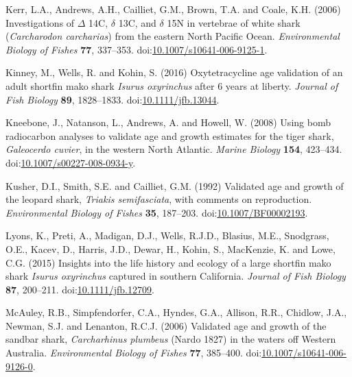 \documentclass[]{article}
\begin{document}
\hypertarget{ref-kerr_investigations_2006}{}
Kerr, L.A., Andrews, A.H., Cailliet, G.M., Brown, T.A. and Coale, K.H.
(2006) Investigations of \(\Delta\) 14C, \(\delta\) 13C, and \(\delta\)
15N in vertebrae of white shark (\emph{Carcharodon carcharias}) from the
eastern North Pacific Ocean. \emph{Environmental Biology of Fishes}
\textbf{77}, 337--353.
doi:\href{https://doi.org/10.1007/s10641-006-9125-1}{10.1007/s10641-006-9125-1}.

\hypertarget{ref-kinney_oxytetracycline_2016}{}
Kinney, M., Wells, R. and Kohin, S. (2016) Oxytetracycline age
validation of an adult shortfin mako shark \emph{Isurus oxyrinchus}
after 6 years at liberty. \emph{Journal of Fish Biology} \textbf{89},
1828--1833.
doi:\href{https://doi.org/10.1111/jfb.13044}{10.1111/jfb.13044}.

\hypertarget{ref-kneebone_using_2008}{}
Kneebone, J., Natanson, L., Andrews, A. and Howell, W. (2008) Using bomb
radiocarbon analyses to validate age and growth estimates for the tiger
shark, \emph{Galeocerdo cuvier}, in the western North Atlantic.
\emph{Marine Biology} \textbf{154}, 423--434.
doi:\href{https://doi.org/10.1007/s00227-008-0934-y}{10.1007/s00227-008-0934-y}.

\hypertarget{ref-kusher_validated_1992}{}
Kusher, D.I., Smith, S.E. and Cailliet, G.M. (1992) Validated age and
growth of the leopard shark, \emph{Triakis semifasciata}, with comments
on reproduction. \emph{Environmental Biology of Fishes} \textbf{35},
187--203.
doi:\href{https://doi.org/10.1007/BF00002193}{10.1007/BF00002193}.

\hypertarget{ref-lyons_insights_2015}{}
Lyons, K., Preti, A., Madigan, D.J., Wells, R.J.D., Blasius, M.E.,
Snodgrass, O.E., Kacev, D., Harris, J.D., Dewar, H., Kohin, S.,
MacKenzie, K. and Lowe, C.G. (2015) Insights into the life history and
ecology of a large shortfin mako shark \emph{Isurus oxyrinchus} captured
in southern California. \emph{Journal of Fish Biology} \textbf{87},
200--211.
doi:\href{https://doi.org/10.1111/jfb.12709}{10.1111/jfb.12709}.

\hypertarget{ref-mcauley_validated_2006}{}
McAuley, R.B., Simpfendorfer, C.A., Hyndes, G.A., Allison, R.R.,
Chidlow, J.A., Newman, S.J. and Lenanton, R.C.J. (2006) Validated age
and growth of the sandbar shark, \emph{Carcharhinus plumbeus} (Nardo
1827) in the waters off Western Australia. \emph{Environmental Biology
of Fishes} \textbf{77}, 385--400.
doi:\href{https://doi.org/10.1007/s10641-006-9126-0}{10.1007/s10641-006-9126-0}.
\end{document}
